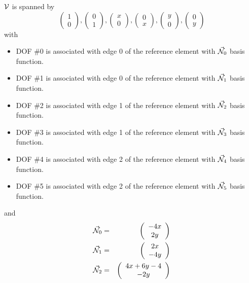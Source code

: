 \begin{itemize}
${\cal V}$ is spanned by 
\[
\left(\begin{array}{c}
1 \\ 0
\end{array}\right),
\left(\begin{array}{c}
0 \\ 1
\end{array}\right),
\left(\begin{array}{c}
x \\ 0
\end{array}\right),
\left(\begin{array}{c}
0 \\ x
\end{array}\right),
\left(\begin{array}{c}
y \\ 0
\end{array}\right),
\left(\begin{array}{c}
0 \\ y
\end{array}\right)
\]
with 
\begin{itemize}
\item DOF \#0 is associated with edge 0 of the reference element with $\vec{{\mathcal{N}}}_0$ basis function.
\item DOF \#1 is associated with edge 0 of the reference element with $\vec{{\mathcal{N}}}_1$ basis function.
\item DOF \#2 is associated with edge 1 of the reference element with $\vec{{\mathcal{N}}}_2$ basis function.
\item DOF \#3 is associated with edge 1 of the reference element with $\vec{{\mathcal{N}}}_3$ basis function.
\item DOF \#4 is associated with edge 2 of the reference element with $\vec{{\mathcal{N}}}_4$ basis function.
\item DOF \#5 is associated with edge 2 of the reference element with $\vec{{\mathcal{N}}}_5$ basis function.
\end{itemize}
and
\begin{eqnarray}
\vec{\bN}_0 &=&  \left(\begin{array}{c} -4x \\ 2y        \end{array}\right) \nn\\  
\vec{\bN}_1 &=&  \left(\begin{array}{c} 2x \\ -4y        \end{array}\right) \nn\\  
\vec{\bN}_2 &=&  \left(\begin{array}{c} 4x+6y-4 \\ -2y   \end{array}\right) \nn\\  

\end{eqnarray}
\end{itemize}
